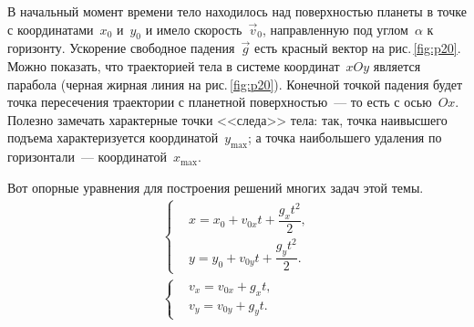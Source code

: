 \documentclass[main.tex]{subfiles}
\begin{document}
В начальный момент времени тело находилось над поверхностью планеты в точке с координатами~$x_0$ и~$y_0$ и имело скорость~$\vec v_0$, направленную под углом~$\alpha$ к горизонту. Ускорение свободное падения~$\vec g$ есть красный вектор на рис.\,\ref{fig:p20}. Можно показать, что траекторией тела в системе координат~$xOy$ является парабола (черная жирная линия на рис.\,\ref{fig:p20}). Конечной точкой падения будет точка пересечения траектории с планетной поверхностью~--- то есть с осью~$Ox$. Полезно замечать характерные точки <<следа>> тела: так, точка наивысшего подъема характеризуется координатой~$y_{\max}$; а точка наибольшего удаления по горизонтали~--- координатой~$x_{\max}$. 

Вот опорные уравнения для построения решений многих задач этой темы. 
\begin{gather*}
\left\{
\begin{aligned}
&x=x_0+v_{0x}t+\dfrac{g_xt^2}{2},\\
&y=y_0+v_{0y}t+\dfrac{g_yt^2}{2}.
\end{aligned}
\right.
\\
\left\{
\begin{aligned}
&v_x=v_{0x}+g_xt,\\
&v_y=v_{0y}+g_yt.
\end{aligned}
\right.
\end{gather*}





 
\end{document}
